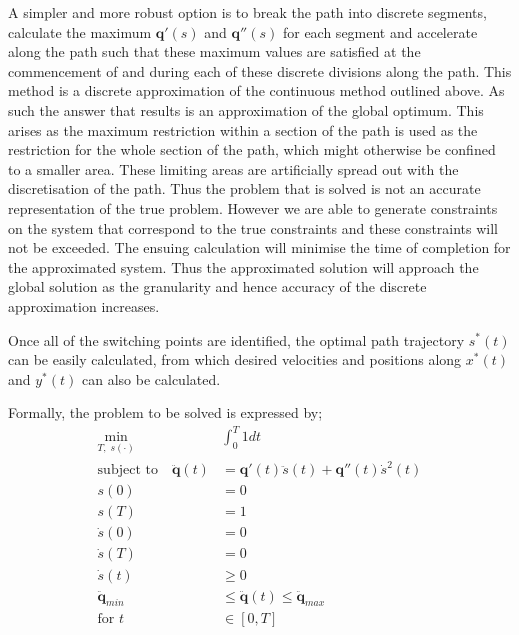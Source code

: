 A simpler and more robust option is to break the path into discrete segments, calculate the maximum $\textbf{q}'(s)$ and $\textbf{q}''(s)$ for each segment and accelerate along the path such that these maximum values are satisfied at the commencement of and during each of these discrete divisions along the path. This method is a discrete approximation of the continuous method outlined above. As such the answer that results is an approximation of the global optimum. This arises as the maximum restriction within a section of the path is used as the restriction for the whole section of the path, which might otherwise be confined to a smaller area. These limiting areas are artificially spread out with the discretisation of the path. Thus the problem that is solved is not an accurate representation of the true problem. However we are able to generate constraints on the system that correspond to the true constraints and these constraints will not be exceeded. The ensuing calculation will minimise the time of completion for the approximated system. Thus the approximated solution will approach the global solution as the granularity and hence accuracy of the discrete approximation increases.

Once all of the switching points are identified, the optimal path trajectory $s^*(t)$ can be easily calculated, from which desired velocities and positions along $x^*(t)$ and $y^*(t)$ can also be calculated.

Formally, the problem to be solved is expressed by;
\begin{align*}
\min_{T, \; s(\cdot)} \;& \int_0^T1dt\\
\text{subject to} \quad \ddot{\textbf{q}}(t) &= \textbf{q}'(t)\ddot{s}(t) + \textbf{q}''(t)\dot{s}^2(t)\\
s(0) &= 0\\
s(T) &= 1\\
\dot{s}(0) &= 0\\
\dot{s}(T) &= 0\\
\dot{s}(t) &\geq 0\\
\ddot{\textbf{q}}_{min} &\leq \ddot{\textbf{q}}(t) \leq \ddot{\textbf{q}}_{max}\\
\text{for } t &\in [0,T]\\
\end{align*}